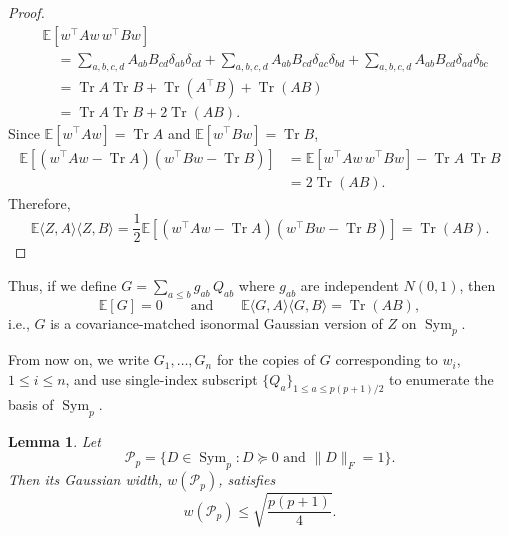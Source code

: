 \documentclass[11pt]{article}
\numberwithin{equation}{section}
\newtheorem{lemma}[theorem]{Lemma}
\theoremstyle{definition}
\theoremstyle{remark}
\newcommand{\E}{\mathbb E}
\newcommand{\1}{\boldsymbol 1}
\begin{document}
\begin{aiblock}
\begin{proof}
    \begin{align*}
        &\E[w^\top A w \, w^\top B w] \\
            &\quad = \sum_{a,b,c,d} A_{ab} B_{cd} \delta_{ab} \delta_{cd}
            +\sum_{a,b,c,d}A_{ab} B_{cd} \delta_{ac} \delta_{bd}
            +\sum_{a,b,c,d}A_{ab} B_{cd} \delta_{ad} \delta_{bc} \\
            &\quad = \operatorname{Tr} A \operatorname{Tr} B
            + \operatorname{Tr}(A^\top B)
            + \operatorname{Tr}(A B) \\
            &\quad = \operatorname{Tr} A \operatorname{Tr} B + 2 \operatorname{Tr}(A B).
    \end{align*}
    Since $\E[w^\top A w] = \operatorname{Tr} A$ and $\E[w^\top B w] = \operatorname{Tr} B$,
    \begin{align*}
        \E[(w^\top A w - \operatorname{Tr} A) (w^\top B w - \operatorname{Tr} B)]
            &= \E[w^\top A w \, w^\top B w] - \operatorname{Tr} A \, \operatorname{Tr} B \\
            &= 2 \operatorname{Tr}(AB).
    \end{align*}
    Therefore,
    \[
        \E \langle Z, A \rangle\langle Z, B \rangle
            = \frac{1}{2} \E[(w^\top A w - \operatorname{Tr} A)(w^\top B w - \operatorname{Tr} B)]
            = \operatorname{Tr}(AB).
    \]

\end{proof}

Thus, if we define $G = \sum_{a\le b} g_{ab} \, Q_{ab}$ where $g_{ab}$ are independent $N(0,1)$, then
\[
    \E[G] = 0
    \qquad \text{and} \qquad
    \E \langle G, A \rangle\langle G, B \rangle = \operatorname{Tr}(AB),
\]
i.e., $G$ is a covariance-matched isonormal Gaussian version of $Z$ on $\operatorname{Sym}_p$.

From now on, we write $G_1, \dots, G_n$ for the copies of $G$ corresponding to $w_i$, $1 \leq i \leq n$, and use single-index subscript $\{Q_a\}_{1 \leq a \leq p (p + 1) / 2}$ to enumerate the basis of $\operatorname{Sym}_p$.



\begin{lemma} \label{lem:infeasibility_above:gaussian_width}
    Let
    \[
        \mathcal P_p = \{D \in \operatorname{Sym}_p : D \succeq 0 \text{~and~} \|D\|_F = 1\}.
    \]
    Then its Gaussian width, $w(\mathcal P_p)$, satisfies
    \[
        w(\mathcal P_p) \le \sqrt{\frac{p (p + 1)}{4}}.
    \]
\end{lemma}


\end{aiblock}
\end{document}

